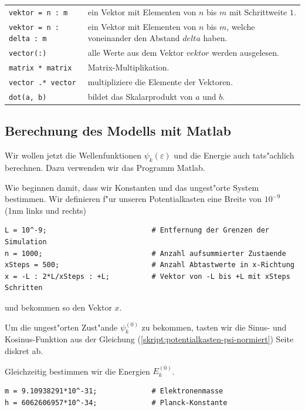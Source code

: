 \begin{refsection}
\begin{center}
	\begin{tabular}{lp{9cm}}
		\verb|vektor = n : m| & ein Vektor mit Elementen von $n$ bis $m$ mit Schrittweite $1$. \\
		\verb|vektor = n : delta : m| & ein Vektor mit Elementen von $n$ bis $m$, welche voneinander den Abstand $delta$ haben. \\
		\verb|vector(:)| & alle Werte aus dem Vektor $vektor$ werden ausgelesen. \\
		\verb|matrix * matrix| & Matrix-Multiplikation. \\
		\verb|vector .* vector| & multipliziere die Elemente der Vektoren. \\
		\verb|dot(a, b)| & bildet das Skalarprodukt von $a$ und $b$.
	\end{tabular}
\end{center}




\subsection{Berechnung des Modells mit Matlab}

Wir wollen jetzt die Wellenfunktionen $\psi_k(\varepsilon)$ und die Energie auch tats"achlich berechnen.
Dazu verwenden wir das Programm Matlab.

Wie beginnen damit, dass wir Konstanten und das ungest"orte System bestimmen.
Wir definieren f"ur unseren Potentialkasten eine Breite von $10^{-9}$ (1nm links und rechts)
\begin{lstlisting}[style=Matlab]
L = 10^-9;                         # Entfernung der Grenzen der Simulation
n = 1000;                          # Anzahl aufsummierter Zustaende
xSteps = 500;                      # Anzahl Abtastwerte in x-Richtung
x = -L : 2*L/xSteps : +L;          # Vektor von -L bis +L mit xSteps Schritten
\end{lstlisting}
und bekommen so den Vektor $x$.

Um die ungest"orten Zust"ande $\psi_k^{(0)}$ zu bekommen, tasten wir die Sinus- und Kosinus-Funktion 
aus der Gleichung (\ref{skript:potentialkasten-psi-normiert}) Seite \pageref{skript:potentialkasten-psi-normiert} diskret ab.

Gleichzeitig bestimmen wir die Energien $E_k^{(0)}$.
\begin{lstlisting}[style=Matlab]
m = 9.10938291*10^-31;             # Elektronenmasse
h = 6062606957*10^-34;             # Planck-Konstante


\end{lstlisting}
\end{refsection}

